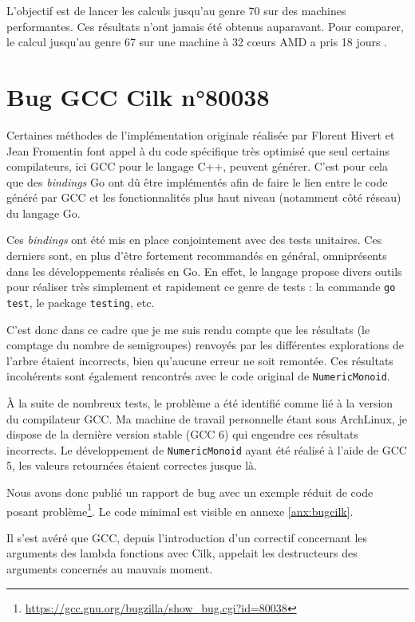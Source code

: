 \documentclass[12pt,a4paper]{report}
\begin{document}
L'objectif est de lancer les calculs jusqu'au genre 70 sur des machines performantes. Ces résultats n'ont jamais été obtenus auparavant. Pour comparer, le calcul jusqu'au genre 67 sur une machine à 32 c\oe{}urs AMD a pris 18 jours \cite{exploring-ns}.

\section{Bug GCC Cilk n°80038}
Certaines méthodes de l'implémentation originale réalisée par Florent Hivert et Jean Fromentin font appel à du code spécifique très optimisé que seul certains compilateurs, ici GCC pour le langage C++, peuvent générer. C'est pour cela que des \emph{bindings} Go ont dû être implémentés afin de faire le lien entre le code généré par GCC et les fonctionnalités plus haut niveau (notamment côté réseau) du langage Go.

Ces \emph{bindings} ont été mis en place conjointement avec des tests unitaires. Ces derniers sont, en plus d'être fortement recommandés en général, omniprésents dans les développements réalisés en Go. En effet, le langage propose divers outils pour réaliser très simplement et rapidement ce genre de tests : la commande \texttt{go test}, le package \texttt{testing}, etc.

C'est donc dans ce cadre que je me suis rendu compte que les résultats (le comptage du nombre de semigroupes) renvoyés par les différentes explorations de l'arbre étaient incorrects, bien qu'aucune erreur ne soit remontée. Ces résultats incohérents sont également rencontrés avec le code original de \texttt{NumericMonoid}.

À la suite de nombreux tests, le problème a été identifié comme lié à la version du compilateur GCC. Ma machine de travail personnelle étant sous ArchLinux, je dispose de la dernière version stable (GCC 6) qui engendre ces résultats incorrects. Le développement de \texttt{NumericMonoid} ayant été réalisé à l'aide de GCC 5, les valeurs retournées étaient correctes jusque là.

Nous avons donc publié un rapport de bug avec un exemple réduit de code posant problème\footnote{\url{https://gcc.gnu.org/bugzilla/show_bug.cgi?id=80038}}. Le code minimal est visible en annexe \ref{anx:bugcilk}.

Il s'est avéré que GCC, depuis l'introduction d'un correctif concernant les arguments des lambda fonctions avec Cilk, appelait les destructeurs des arguments concernés au mauvais moment.
\end{document}
